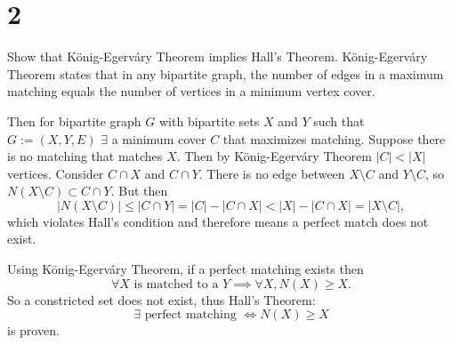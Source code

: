 \section*{2}
Show that König-Egerváry Theorem implies Hall’s Theorem.
\probLine
König-Egerváry Theorem states that in any bipartite graph, the number of edges in a maximum matching equals the number of vertices in a minimum vertex cover.

Then for bipartite graph $G$ with bipartite sets $X$ and $Y$ such that $G:= (X ,Y, E)$ $\exists$ a minimum cover $C$ that maximizes matching.
Suppose there is no matching that matches $X$. Then by König-Egerváry Theorem $|C| < |X|$ vertices. Consider $C \cap X$ and $C \cap Y$. There is no edge between $X \setminus C$ and $Y \setminus C$, so $N(X \setminus C) \subset C \cap Y$. But then
\[
    |N(X \setminus C)| \leq |C \cap Y| = |C| - |C \cap X| < |X| - |C \cap X| = |X \setminus C|,
\]
which violates Hall’s condition and therefore means a perfect match does not exist.

Using König-Egerváry Theorem, if a perfect matching exists then
\[
    \forall X \text{ is matched to a } Y \implies \forall X, N(X) \geq X.
\]
So a constricted set does not exist, thus Hall's Theorem:
\[
    \exists \text{ perfect matching } \iff N(X) \geq X
\]
is proven.


